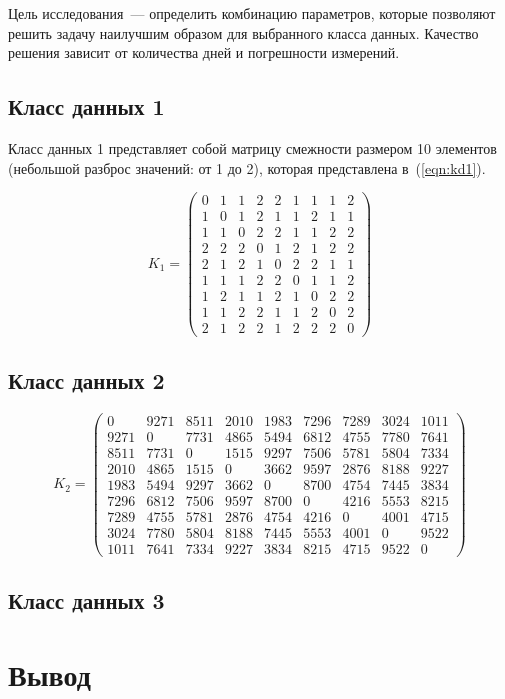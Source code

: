 Цель исследования~--- определить комбинацию параметров, которые позволяют решить задачу наилучшим образом для выбранного класса данных.
Качество решения зависит от количества дней и погрешности измерений.

\subsection{Класс данных 1}
\label{par:class1}

Класс данных 1 представляет собой матрицу смежности размером 10 элементов (небольшой разброс значений: от 1 до 2), которая представлена в~(\ref{eqn:kd1}).

\begin{equation}
	\label{eqn:kd1}
	K_{1} = \begin{pmatrix}
		0 & 1 & 1 & 2 & 2 & 1 & 1 & 1 & 2 \\ 
		1 & 0 & 1 & 2 & 1 & 1 & 2 & 1 & 1 \\ 
		1 & 1 & 0 & 2 & 2 & 1 & 1 & 2 & 2 \\ 
		2 & 2 & 2 & 0 & 1 & 2 & 1 & 2 & 2 \\ 
		2 & 1 & 2 & 1 & 0 & 2 & 2 & 1 & 1 \\ 
		1 & 1 & 1 & 2 & 2 & 0 & 1 & 1 & 2 \\ 
		1 & 2 & 1 & 1 & 2 & 1 & 0 & 2 & 2 \\ 
		1 & 1 & 2 & 2 & 1 & 1 & 2 & 0 & 2 \\ 
		2 & 1 & 2 & 2 & 1 & 2 & 2 & 2 & 0 
	\end{pmatrix}
\end{equation}

\subsection{Класс данных 2}
\label{par:class2}

\begin{equation}
	\label{eqт:kd2}
	K_{2} = \begin{pmatrix}
		0 & 9271 & 8511 & 2010 & 1983 & 7296 & 7289 & 3024 & 1011 \\
		9271 & 0 & 7731 & 4865 & 5494 & 6812 & 4755 & 7780 & 7641 \\
		8511 & 7731 & 0 & 1515 & 9297 & 7506 & 5781 & 5804 & 7334 \\
		2010 & 4865 & 1515 & 0 & 3662 & 9597 & 2876 & 8188 & 9227 \\
		1983 & 5494 & 9297 & 3662 & 0 & 8700 & 4754 & 7445 & 3834 \\
		7296 & 6812 & 7506 & 9597 & 8700 & 0 & 4216 & 5553 & 8215 \\
		7289 & 4755 & 5781 & 2876 & 4754 & 4216 & 0 & 4001 & 4715 \\
		3024 & 7780 & 5804 & 8188 & 7445 & 5553 & 4001 & 0 & 9522 \\
		1011 & 7641 & 7334 & 9227 & 3834 & 8215 & 4715 & 9522 & 0 
	\end{pmatrix}
\end{equation}

\subsection{Класс данных 3}

\section{Вывод}